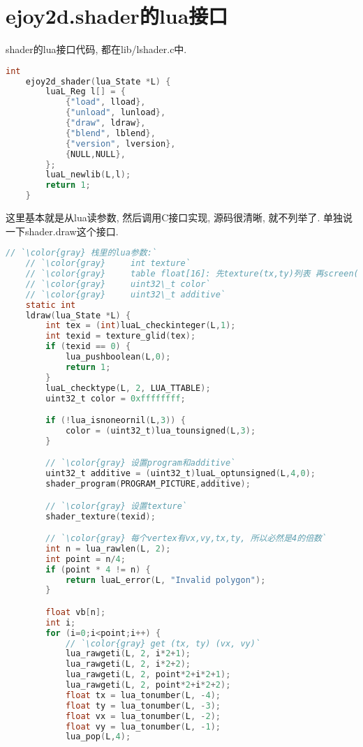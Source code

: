 \section {\ZHH ejoy2d.shader的lua接口} {

    {shader的lua接口代码, 都在lib/lshader.c中. }\par

    \begin{lstlisting}[language=C]
    int
    ejoy2d_shader(lua_State *L) {
        luaL_Reg l[] = {
            {"load", lload},
            {"unload", lunload},
            {"draw", ldraw},
            {"blend", lblend},
            {"version", lversion},
            {NULL,NULL},
        };
        luaL_newlib(L,l);
        return 1;
    }
    \end{lstlisting}

    {这里基本就是从lua读参数, 然后调用C接口实现, 源码很清晰, 就不列举了. 单独说一下shader.draw这个接口.}\par

    \begin{lstlisting}[language=C]
    // `\color{gray} 栈里的lua参数:`
    // `\color{gray}     int texture`
    // `\color{gray}     table float[16]: 先texture(tx,ty)列表 再screen(vx, vy)列表`
    // `\color{gray}     uint32\_t color`
    // `\color{gray}     uint32\_t additive`
    static int
    ldraw(lua_State *L) {
        int tex = (int)luaL_checkinteger(L,1);
        int texid = texture_glid(tex);
        if (texid == 0) {
            lua_pushboolean(L,0);
            return 1;
        }
        luaL_checktype(L, 2, LUA_TTABLE);
        uint32_t color = 0xffffffff;

        if (!lua_isnoneornil(L,3)) {
            color = (uint32_t)lua_tounsigned(L,3);
        }

        // `\color{gray} 设置program和additive`
        uint32_t additive = (uint32_t)luaL_optunsigned(L,4,0);
        shader_program(PROGRAM_PICTURE,additive);

        // `\color{gray} 设置texture`
        shader_texture(texid);

        // `\color{gray} 每个vertex有vx,vy,tx,ty, 所以必然是4的倍数`
        int n = lua_rawlen(L, 2);
        int point = n/4;
        if (point * 4 != n) {
            return luaL_error(L, "Invalid polygon");
        }

        float vb[n];
        int i;
        for (i=0;i<point;i++) {
            // `\color{gray} get (tx, ty) (vx, vy)`
            lua_rawgeti(L, 2, i*2+1);
            lua_rawgeti(L, 2, i*2+2);
            lua_rawgeti(L, 2, point*2+i*2+1);
            lua_rawgeti(L, 2, point*2+i*2+2);
            float tx = lua_tonumber(L, -4);
            float ty = lua_tonumber(L, -3);
            float vx = lua_tonumber(L, -2);
            float vy = lua_tonumber(L, -1);
            lua_pop(L,4);


\end{lstlisting}}
